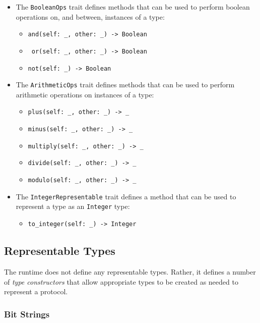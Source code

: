 \documentclass[10pt,twocolumn,a4paper]{article}
\newcommand{\code}[1]{\texttt{#1}}
\begin{document}
\begin{itemize}
  \item The \code{BooleanOps} trait defines methods that can be used to
    perform boolean operations on, and between, instances of a type:
    \begin{itemize}
      \item \texttt{and(self: \_, other: \_) -> Boolean}
      \item \texttt{ or(self: \_, other: \_) -> Boolean}
      \item \texttt{not(self: \_) -> Boolean}
    \end{itemize}

  \item The \code{ArithmeticOps} trait defines methods that can be used to
    perform arithmetic operations on instances of a type:
    \begin{itemize}
      \item \texttt{plus(self: \_, other: \_) -> \_}
      \item \texttt{minus(self: \_, other: \_) -> \_}
      \item \texttt{multiply(self: \_, other: \_) -> \_}
      \item \texttt{divide(self: \_, other: \_) -> \_}
      \item \texttt{modulo(self: \_, other: \_) -> \_}
    \end{itemize}

  \item The \code{IntegerRepresentable} trait defines a method that can be
    used to represent a type as an \code{Integer} type:
    \begin{itemize}
      \item \texttt{to\_integer(self: \_) -> Integer}
    \end{itemize}
\end{itemize}

\subsection{Representable Types}
\label{sec:representable}

The runtime does not define any representable types. Rather, it defines
a number of \emph{type constructors} that allow appropriate types to be
created as needed to represent a protocol.

\subsubsection{Bit Strings}
\label{sec:bit-string}
\end{document}
